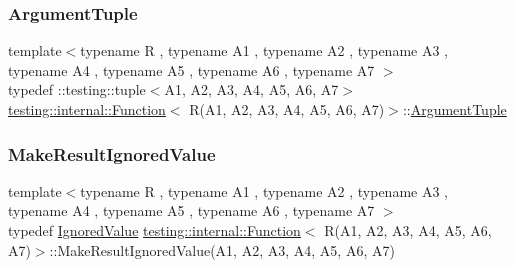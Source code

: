 \subsubsection{\texorpdfstring{ArgumentTuple}{ArgumentTuple}}
{\footnotesize\ttfamily template$<$typename R , typename A1 , typename A2 , typename A3 , typename A4 , typename A5 , typename A6 , typename A7 $>$ \\
typedef \+::testing\+::tuple$<$A1, A2, A3, A4, A5, A6, A7$>$ \mbox{\hyperlink{structtesting_1_1internal_1_1Function}{testing\+::internal\+::\+Function}}$<$ R(A1, A2, A3, A4, A5, A6, A7)$>$\+::\mbox{\hyperlink{structtesting_1_1internal_1_1Function_3_01R_07_08_4_ad483c3128c470d8cdb55c3ac1c575c11}{Argument\+Tuple}}}

\mbox{\label{structtesting_1_1internal_1_1Function_3_01R_07A1_00_01A2_00_01A3_00_01A4_00_01A5_00_01A6_00_01A7_08_4_a12b0ade73c76ea564afa7dd2b5c219b6}} 
\subsubsection{\texorpdfstring{MakeResultIgnoredValue}{MakeResultIgnoredValue}}
{\footnotesize\ttfamily template$<$typename R , typename A1 , typename A2 , typename A3 , typename A4 , typename A5 , typename A6 , typename A7 $>$ \\
typedef \mbox{\hyperlink{classtesting_1_1internal_1_1IgnoredValue}{Ignored\+Value}} \mbox{\hyperlink{structtesting_1_1internal_1_1Function}{testing\+::internal\+::\+Function}}$<$ R(A1, A2, A3, A4, A5, A6, A7)$>$\+::Make\+Result\+Ignored\+Value(A1, A2, A3, A4, A5, A6, A7)}

\mbox{\label{structtesting_1_1internal_1_1Function_3_01R_07A1_00_01A2_00_01A3_00_01A4_00_01A5_00_01A6_00_01A7_08_4_a9e3d04c8472e00161b080690f62f9eb4}} 
